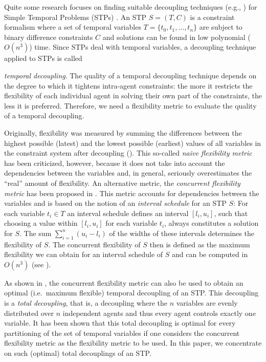 Quite some research focuses on finding suitable decoupling techniques (e.g., \cite{hunsberger:2002a,brambilla:2010,boerkoel:2013}) for Simple Temporal Problems (STPs) \cite{dechter:2003}.
An STP $S=(T,C)$ is a constraint formalism where a set of temporal variables $T=\{t_0, t_1,\ldots,t_n\}$ 
are subject to binary difference constraints $C$ and solutions can be found in low polynomial ($O(n^3)$) time. 
Since STPs deal with temporal variables, a decoupling technique applied to STPs is called {\emph{temporal decoupling}.
The quality of a temporal decoupling technique depends on the degree to which it tightens intra-agent constraints:
the more it restricts the flexibility of each individual agent in solving their own part of the constraints, the less it is preferred.
Therefore, we need a flexibility metric to evaluate the quality of a temporal decoupling.

Originally, flexibility was measured by summing the differences between the highest possible (latest) and 
the lowest possible (earliest) values of all variables in the constraint system after decoupling (\cite{hunsberger:2002a,hunsberger:2002b}). 
This so-called \emph{naive flexibility metric} has been criticized, however, because it does not take into account the dependencies between the variables and, 
in general, seriously overestimates the ``real'' amount of flexibility.
An alternative metric, the \emph{concurrent flexibility metric} has been proposed in \cite{wilson:2014}. 
This metric accounts for dependencies between the variables and is based on the notion of an \emph{interval schedule} for an STP $S$: 
For each variable $t_i \in T$ an interval schedule defines an interval $[l_i, u_i]$,
such that choosing a value within $[l_i, u_i]$ for each variable $t_i$, always constitutes a solution for $S$.
The sum $\sum^n_{i=1} (u_i - l_i)$ of the widths of these intervals determines the flexibility of $S$. 
The concurrent flexibility of $S$ then is defined as the maximum flexibility we can obtain for an 
interval schedule of $S$ and can be computed in $O(n^3)$ (see \cite{mountakis:2015}).

As shown in \cite{wilson:2014}, the concurrent flexibility metric can also be used to obtain an optimal (i.e.~maximum flexible) temporal decoupling of an STP. 
This decoupling is a \emph{total decoupling}, that is, a decoupling where the $n$ variables are evenly distributed over $n$ independent agents and thus every agent controls exactly one variable. 
It has been shown that this total decoupling is optimal for every partitioning of the set of temporal variables if one considers the concurrent flexibility metric as the flexibility metric to be used. 
In this paper, we concentrate on such (optimal) total decouplings of an STP. 

}

